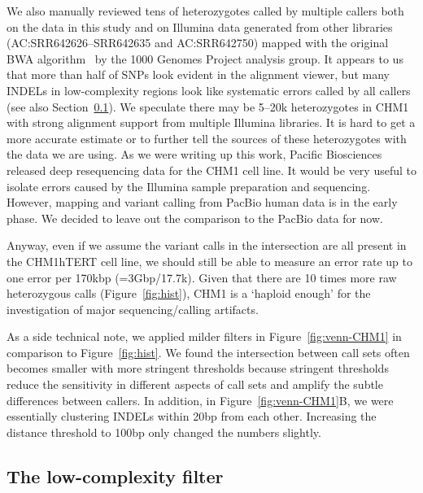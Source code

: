 \documentclass{bioinfo}
\begin{document}
We also manually reviewed tens of heterozygotes called by multiple callers both
on the data in this study and on Illumina data generated from other libraries
(AC:SRR642626--SRR642635 and AC:SRR642750) mapped with the original BWA
algorithm~\citep{Li:2009uq} by the 1000 Genomes Project analysis group. It
appears to us that more than half of SNPs look evident in the alignment viewer,
but many INDELs in low-complexity regions look like systematic errors called by
all callers (see also Section~\ref{sec:lc}).  We speculate there may be 5--20k
heterozygotes in CHM1 with strong alignment support from multiple Illumina
libraries. It is hard to get a more accurate estimate or to further tell the
sources of these heterozygotes with the data we are using. As we were writing up
this work, Pacific Biosciences released deep resequencing data for the CHM1
cell line. It would be very useful to isolate errors caused by the Illumina
sample preparation and sequencing. However, mapping and variant calling from
PacBio human data is in the early phase. We decided to leave out the comparison
to the PacBio data for now.

Anyway, even if we assume the variant calls in the intersection are all present
in the CHM1hTERT cell line, we should still be able to measure an error rate up
to one error per 170kbp (=3Gbp/17.7k). Given that there are 10 times more raw
heterozygous calls (Figure~\ref{fig:hist}), CHM1 is a `haploid enough' for the
investigation of major sequencing/calling artifacts.

As a side technical note, we applied milder filters in
Figure~\ref{fig:venn-CHM1} in comparison to Figure~\ref{fig:hist}. We found the
intersection between call sets often becomes smaller with more stringent
thresholds because stringent thresholds reduce the sensitivity in different
aspects of call sets and amplify the subtle differences between callers. In
addition, in Figure~\ref{fig:venn-CHM1}B, we were essentially clustering INDELs
within 20bp from each other. Increasing the distance threshold to 100bp only
changed the numbers slightly.

\subsection{The low-complexity filter}\label{sec:lc}
\end{document}

